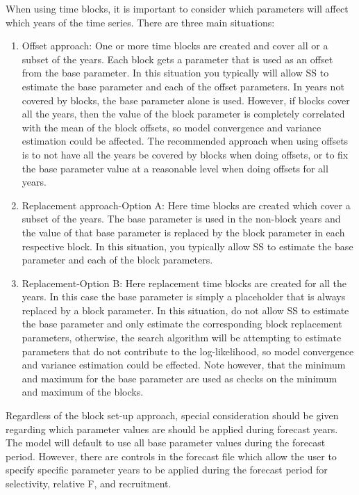 When using time blocks, it is important to consider which parameters will affect which years of the time series.  There are three main situations:
\begin{enumerate}
	\item Offset approach: One or more time blocks are created and cover all or a subset of the years.  Each block gets a parameter that is used as an offset from the base parameter.  In this situation you typically will allow SS to estimate the base parameter and each of the offset parameters.  In years not covered by blocks, the base parameter alone is used.  However, if blocks cover all the years, then the value of the block parameter is completely correlated with the mean of the block offsets, so model convergence and variance estimation could be affected.  The recommended approach when using offsets is to not have all the years be covered by blocks when doing offsets, or to fix the base parameter value at a reasonable level when doing offsets for all years.	
	\item Replacement approach-Option A: Here time blocks are created which cover a subset of the years.  The base parameter is used in the non-block years and the value of that base parameter is replaced by the block parameter in each respective block.  In this situation, you typically allow SS to estimate the base parameter and each of the block parameters.	
	\item Replacement-Option B: Here replacement time blocks are created for all the years.  In this case the base parameter is simply a placeholder that is always replaced by a block parameter.   In this situation, do not allow SS to estimate the base parameter and only estimate the corresponding block replacement parameters, otherwise, the search algorithm will be attempting to estimate parameters that do not contribute to the log-likelihood, so model convergence and variance estimation could be effected.  Note however, that the minimum and maximum for the base parameter are used as checks on the minimum and maximum of the blocks.
\end{enumerate}

Regardless of the block set-up approach, special consideration should be given regarding which parameter values are should be applied during forecast years.  The model will default to use all base parameter values during the forecast period.  However, there are controls in the forecast file which allow the user to specify specific parameter years to be applied during the forecast period for selectivity, relative F, and recruitment.  

